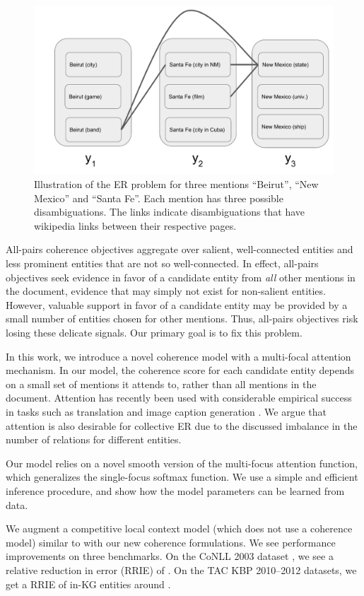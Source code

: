 \begin{figure}[t]
\centering\includegraphics[width=0.5\linewidth]{beirut.pdf}
\caption{Illustration of the ER problem for three mentions
  ``Beirut'', ``New Mexico'' and ``Santa Fe''. Each mention has three
  possible disambiguations. The links indicate disambiguations that
  have wikipedia links between their respective pages.
}
\label{fig:ereg}
\end{figure}

All-pairs coherence objectives aggregate over salient, well-connected
entities and less prominent entities that are not so well-connected.
In effect, all-pairs objectives seek evidence in favor of a candidate
entity from \emph{all} other mentions in the document, evidence that
may simply not exist for non-salient entities.  However, valuable
support in favor of a candidate entity may be provided by a small
number of entities chosen for other mentions.  Thus, all-pairs
objectives risk losing these delicate signals.  Our primary goal is to
fix this problem.

In this work, we introduce a novel coherence model with a multi-focal
attention mechanism. In our model, the coherence score for each
candidate entity depends on a small set of mentions it attends to,
rather than all mentions in the document. Attention has recently been
used with considerable empirical success in tasks such as translation
\cite{bahdanau2014neural} and image caption generation
\cite{xu2015show}. We argue that attention is also desirable for
collective ER due to the discussed imbalance in the number of
relations for different entities.

Our model relies on a novel smooth version of the multi-focus
attention function, which generalizes the single-focus softmax
function. We use a simple and efficient inference procedure, and show
how the model parameters can be learned from data.

We augment a competitive local context model (which does not use a
coherence model) similar to \cite{Lazic2015} with our new coherence
formulations.  We see performance improvements on three benchmarks.
On the CoNLL 2003 dataset \cite{Hoffart2011}, we see a relative
reduction in error (RRIE) of .  On the TAC KBP 2010--2012
datasets, we get a RRIE of in-KG entities around .

